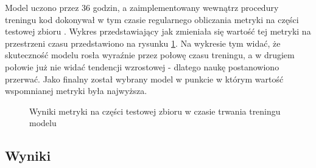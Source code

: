Model uczono przez 36 godzin, a zaimplementowany wewnątrz procedury treningu kod dokonywał w tym czasie regularnego obliczania metryki  na części testowej zbioru . Wykres przedstawiający jak zmieniała się wartość tej metryki na przestrzeni czasu przedstawiono na rysunku \ref{plot:bridge-accuracy}. Na wykresie tym widać, że skuteczność modelu rosła wyraźnie przez połowę czasu treningu, a w drugiem połowie już nie widać tendencji wzrostowej - dlatego naukę postanowiono przerwać. Jako finalny został wybrany model w punkcie w którym wartość wspomnianej metryki była najwyższa.

\begin{figure}[ht!]
  \begin{center}
    \caption{Wyniki metryki  na części testowej zbioru  w czasie trwania treningu modelu}
    \label{plot:bridge-accuracy}
  \end{center}
\end{figure}

\subsection{Wyniki}

\lipsum[1][1-7]

